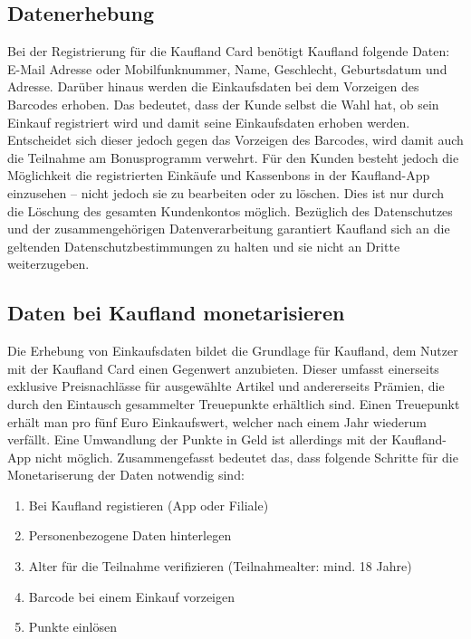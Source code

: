 \subsection{Datenerhebung}
Bei der Registrierung für die Kaufland Card benötigt Kaufland folgende Daten: E-Mail Adresse oder Mobilfunknummer, Name, Geschlecht, Geburtsdatum und Adresse. Darüber hinaus werden die Einkaufsdaten bei dem Vorzeigen des Barcodes erhoben. Das bedeutet, dass der Kunde selbst die Wahl hat, ob sein Einkauf registriert wird und damit seine Einkaufsdaten erhoben werden. Entscheidet sich dieser jedoch gegen das Vorzeigen des Barcodes, wird damit auch die Teilnahme am Bonusprogramm verwehrt. Für den Kunden besteht jedoch die Möglichkeit die registrierten Einkäufe und Kassenbons in der Kaufland-App einzusehen -- nicht jedoch sie zu bearbeiten oder zu löschen. Dies ist nur durch die Löschung des gesamten Kundenkontos möglich. \cite{Kaufland_FAQ} Bezüglich des Datenschutzes und der zusammengehörigen Datenverarbeitung garantiert Kaufland sich an die geltenden Datenschutzbestimmungen zu halten und sie nicht an Dritte weiterzugeben. \cite{Kaufland_Rechtliches} 

\subsection{Daten bei Kaufland monetarisieren}
Die Erhebung von Einkaufsdaten bildet die Grundlage für Kaufland, dem Nutzer mit der Kaufland Card einen Gegenwert anzubieten. Dieser umfasst einerseits exklusive Preisnachlässe für ausgewählte Artikel und andererseits Prämien, die durch den Eintausch gesammelter Treuepunkte erhältlich sind. Einen Treuepunkt erhält man pro fünf Euro Einkaufswert, welcher nach einem Jahr wiederum verfällt. Eine Umwandlung der Punkte in Geld ist allerdings mit der Kaufland-App nicht möglich. \cite{Kaufland_FAQ} Zusammengefasst bedeutet das, dass folgende Schritte für die Monetariserung der Daten notwendig sind:

\begin{enumerate}
	\item Bei Kaufland registieren (App oder Filiale) 
	\item Personenbezogene Daten hinterlegen
	\item Alter für die Teilnahme verifizieren (Teilnahmealter: mind. 18 Jahre)
	\item Barcode bei einem Einkauf vorzeigen
	\item Punkte einlösen
\end{enumerate}
